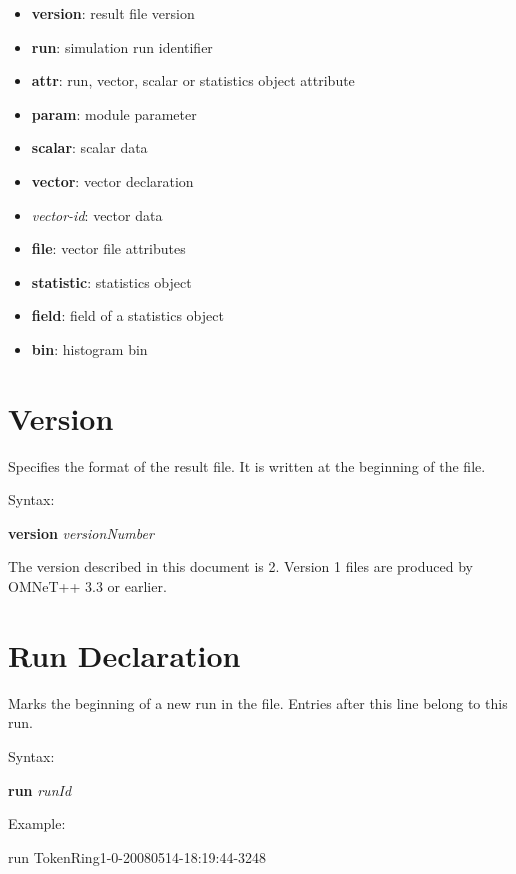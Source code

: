 \begin{itemize}
    \item \textbf{version}: result file version
    \item \textbf{run}: simulation run identifier
    \item \textbf{attr}: run, vector, scalar or statistics object attribute
    \item \textbf{param}: module parameter
    \item \textbf{scalar}: scalar data
    \item \textbf{vector}: vector declaration
    \item \textit{vector-id}: vector data
    \item \textbf{file}: vector file attributes
    \item \textbf{statistic}: statistics object
    \item \textbf{field}: field of a statistics object
    \item \textbf{bin}: histogram bin
\end{itemize}



\section{Version}
\label{sec:result-file-formats:version}

Specifies the format of the result file. It is written at the beginning of the file.

Syntax:

\hspace{20mm} \textbf{version} \textit{versionNumber}

The version described in this document is 2. Version 1 files are produced
by OMNeT++ 3.3 or earlier.



\section{Run Declaration}
\label{sec:result-file-formats:run-declaration}

Marks the beginning of a new run in the file. Entries after this line
belong to this run.

Syntax:

\hspace{20mm} \textbf{run} \textit{runId}

Example:

\begin{filelisting}
run TokenRing1-0-20080514-18:19:44-3248
\end{filelisting}

